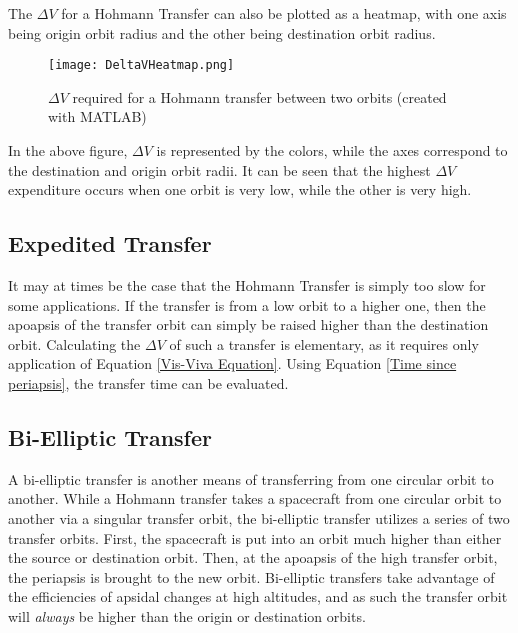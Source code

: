 \documentclass[../basicOrbitalDynamics.tex]{subfiles}
\begin{document}
The $\Delta V$ for a Hohmann Transfer can also be plotted as a heatmap, with one axis being origin orbit radius and the other being destination orbit radius.

\begin{figure}[H]
    \centering
    \texttt{[image: DeltaVHeatmap.png]}
    \caption{$\Delta V$ required for a Hohmann transfer between two orbits (created with MATLAB)}\label{fig:Delta V Heatmap}
\end{figure}

In the above figure, $\Delta V$ is represented by the colors, while the axes correspond to the destination and origin orbit radii. It can be seen that the highest $\Delta V$ expenditure occurs when one orbit is very low, while the other is very high.
\bigskip\bigskip
\subsection{Expedited Transfer}

It may at times be the case that the Hohmann Transfer is simply too slow for some applications. If the transfer is from a low orbit to a higher one, then the apoapsis of the transfer orbit can simply be raised higher than the destination orbit. Calculating the $\Delta V$ of such a transfer is elementary, as it requires only application of Equation  \eqref{Vis-Viva Equation}. Using Equation  \eqref{Time since periapsis}, the transfer time can be evaluated.

\bigskip\bigskip
\subsection{Bi-Elliptic Transfer}

A bi-elliptic transfer is another means of transferring from one circular orbit to another. While a Hohmann transfer takes a spacecraft from one circular orbit to another via a singular transfer orbit, the bi-elliptic transfer utilizes a series of two transfer orbits. First, the spacecraft is put into an orbit much higher than either the source or destination orbit. Then, at the apoapsis of the high transfer orbit, the periapsis is brought to the new orbit. Bi-elliptic transfers take advantage of the efficiencies of apsidal changes at high altitudes, and as such the transfer orbit will \textit{always} be higher than the origin or destination orbits.
\end{document}
